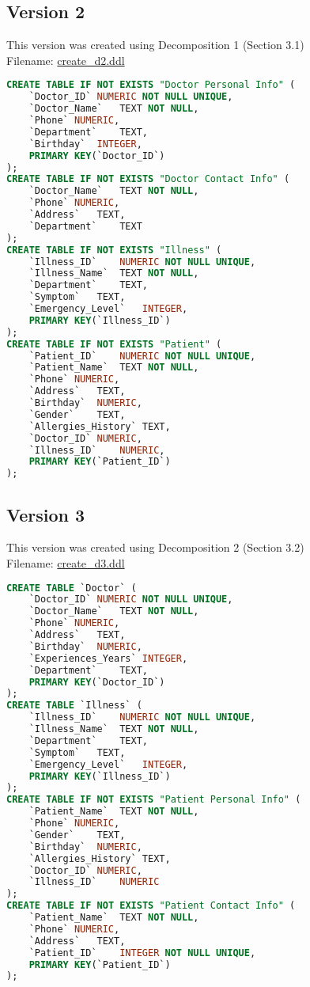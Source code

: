 \documentclass[12pt,arial]{article}
\begin{document}
\subsection{Version 2}
This version was created using Decomposition 1 (Section 3.1)\\
Filename: \url{create_d2.ddl}
\begin{lstlisting}[language=SQL]
CREATE TABLE IF NOT EXISTS "Doctor Personal Info" (
	`Doctor_ID`	NUMERIC NOT NULL UNIQUE,
	`Doctor_Name`	TEXT NOT NULL,
	`Phone`	NUMERIC,
	`Department`	TEXT,
	`Birthday`	INTEGER,
	PRIMARY KEY(`Doctor_ID`)
);
CREATE TABLE IF NOT EXISTS "Doctor Contact Info" (
	`Doctor_Name`	TEXT NOT NULL,
	`Phone`	NUMERIC,
	`Address`	TEXT,
	`Department`	TEXT
);
CREATE TABLE IF NOT EXISTS "Illness" (
	`Illness_ID`	NUMERIC NOT NULL UNIQUE,
	`Illness_Name`	TEXT NOT NULL,
	`Department`	TEXT,
	`Symptom`	TEXT,
	`Emergency_Level`	INTEGER,
	PRIMARY KEY(`Illness_ID`)
);
CREATE TABLE IF NOT EXISTS "Patient" (
	`Patient_ID`	NUMERIC NOT NULL UNIQUE,
	`Patient_Name`	TEXT NOT NULL,
	`Phone`	NUMERIC,
	`Address`	TEXT,
	`Birthday`	NUMERIC,
	`Gender`	TEXT,
	`Allergies_History`	TEXT,
	`Doctor_ID`	NUMERIC,
	`Illness_ID`	NUMERIC,
	PRIMARY KEY(`Patient_ID`)
);
\end{lstlisting}
\subsection{Version 3}
This version was created using Decomposition 2 (Section 3.2)\\
Filename: \url{create_d3.ddl}
\begin{lstlisting}[language=SQL]
CREATE TABLE `Doctor` (
	`Doctor_ID`	NUMERIC NOT NULL UNIQUE,
	`Doctor_Name`	TEXT NOT NULL,
	`Phone`	NUMERIC,
	`Address`	TEXT,
	`Birthday`	NUMERIC,
	`Experiences_Years`	INTEGER,
	`Department`	TEXT,
	PRIMARY KEY(`Doctor_ID`)
);
CREATE TABLE `Illness` (
	`Illness_ID`	NUMERIC NOT NULL UNIQUE,
	`Illness_Name`	TEXT NOT NULL,
	`Department`	TEXT,
	`Symptom`	TEXT,
	`Emergency_Level`	INTEGER,
	PRIMARY KEY(`Illness_ID`)
);
CREATE TABLE IF NOT EXISTS "Patient Personal Info" (
	`Patient_Name`	TEXT NOT NULL,
	`Phone`	NUMERIC,
	`Gender`	TEXT,
	`Birthday`	NUMERIC,
	`Allergies_History`	TEXT,
	`Doctor_ID`	NUMERIC,
	`Illness_ID`	NUMERIC
);
CREATE TABLE IF NOT EXISTS "Patient Contact Info" (
	`Patient_Name`	TEXT NOT NULL,
	`Phone`	NUMERIC,
	`Address`	TEXT,
	`Patient_ID`	INTEGER NOT NULL UNIQUE,
	PRIMARY KEY(`Patient_ID`)
);
	
\end{lstlisting}
\end{document}
